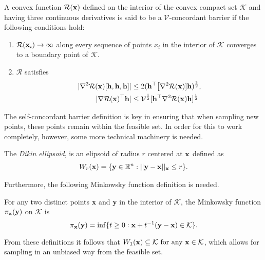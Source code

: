 \begin{definition}
	A convex function $\mathcal{R}({\bf x})$ defined on the interior of the convex compact set $\mathcal{K}$ and having three continuous derivatives is said to be a $\mathcal{V}$-concordant barrier if the following conditions hold:

	\begin{enumerate}
		\item $\mathcal{R}({\bf x}_i) \rightarrow \infty$ along every sequence of points $x_i$ in the interior of $\mathcal{K}$ converges to a boundary point of $\mathcal{K}$.

		\item $\mathcal{R}$ satisfies 
		\begin{align*}
			|\nabla^3 \mathcal{R}({\bf x}) [{\bf h}, {\bf h}, {\bf h}]| &\leq 2({\bf h}^\top \big[\nabla^2 \mathcal{R}({\bf x})]{\bf h})^{\frac{3}{2}},\\
			|\nabla \mathcal{R}({\bf x})^\top {\bf h}| &\leq \mathcal{V}^{\frac{1}{2}}[{\bf h}^\top \nabla^2 \mathcal{R}({\bf x}) {\bf h}]^\frac{1}{2}
		\end{align*}
	\end{enumerate}
\end{definition}

The self-concordant barrier definition is key in ensuring that when sampling new points, these points remain within the feasible set. In order for this to work completely, however, some more technical machinery is needed.

\begin{definition}
	The \textit{Dikin ellipsoid}, is an elipsoid of radius $r$ centered at ${\bf x}$ defined as
	\begin{align*}
		W_r({\bf x}) = \{ {\bf y} \in  \mathbb{R}^n : ||{\bf y} - {\bf x}||_{\bf x} \leq r \}.
	\end{align*}
\end{definition}

Furthermore, the following Minkowsky function definition is needed.

\begin{definition} 
	For any two distinct points {\bf x} and {\bf y} in the interior of $\mathcal{K}$, the Minkowsky
	function ${\bf \pi_x(y)}$ on $\mathcal{K}$ is 
		$${\bf \pi_x(y)} = \inf\{t \geq 0 : {\bf x} + t^{-1}({\bf y - x}) \in \mathcal{K} \}.$$
\end{definition}

From these definitions it follows that $W_1({\bf x}) \subseteq \mathcal{K} \text{ for any } {\bf x} \in \mathcal{K}$, which allows for sampling in an unbiased way from the feasible set.


